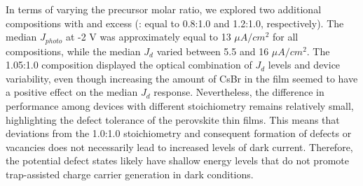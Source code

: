 In terms of varying the precursor molar ratio, we explored two additional compositions with  and  excess (: equal to 0.8:1.0 and 1.2:1.0, respectively). The median $J_{photo}$ at -2 V was approximately equal to 13 $\mu A/cm^2$ for all compositions, while the median $J_d$ varied between 5.5 and 16 $\mu A/cm^2$. The 1.05:1.0 composition displayed the optical combination of $J_d$ levels and device variability, even though increasing the amount of CsBr in the film seemed to have a positive effect on the median $J_d$ response. Nevertheless, the difference in performance among devices with different stoichiometry remains relatively small, highlighting the defect tolerance of the perovskite thin films. This means that deviations from the 1.0:1.0 stoichiometry and consequent formation of defects or vacancies does not necessarily lead to increased levels of dark current. Therefore, the potential defect states likely have shallow energy levels that do not promote trap-assisted charge carrier generation in dark conditions.

